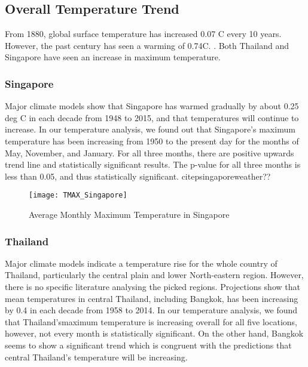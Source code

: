 \subsection{Overall Temperature Trend}
From 1880, global surface temperature has increased 0.07 \degree C every 10 years. However, the past century has seen a warming of 0.74\degree C. \citep{tempincrease}. Both Thailand and Singapore have seen an increase in maximum temperature.

\subsubsection{Singapore}

Major climate models show that Singapore has warmed gradually by about 0.25 deg C in each decade from 1948 to 2015, and that temperatures will continue to increase. In our temperature analysis, we found out that Singapore's maximum temperature has been increasing from 1950 to the present day for the months of May, November, and January. For all three months, there are positive upwards trend line and statistically significant results. The p-value for all three months is less than 0.05, and thus statistically significant. citep{singaporeweather}??

\citet{loo2015effect}

\begin{figure}[h!]
\centering
  \texttt{[image: TMAX\_Singapore]}
  \caption{Average Monthly Maximum Temperature in Singapore}
  \label{fig:TMAX_Singapore}
\end{figure}

\subsubsection{Thailand}

Major climate models indicate a temperature rise for the whole country of Thailand, particularly the central plain and lower North-eastern region. However, there is no specific literature analysing the picked regions. Projections show that mean temperatures in central Thailand, including Bangkok, has been increasing by 0.4 in each decade from 1958 to 2014. In our temperature analysis, we found that Thailand'smaximum temperature is increasing overall for all five locations, however, not every month is statistically significant. On the other hand, Bangkok seems to show a significant trend which is congruent with the predictions that central Thailand's temperature will be increasing.  \citep{bkkweather}

